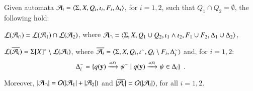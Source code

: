 \begin{theorem}\label{thm:closure}
  Given automata $\mathcal{A}_i = \langle \Sigma,X,Q_i,\iota_i,F_i,\Delta_i \rangle$,
  for $i=1,2$, such that $Q_1 \cap Q_2 = \emptyset$, the following hold: 
  \begin{compactenum}
    \item\label{it1:thm:closure} ${\mathcal L}({\mathcal{A}_\cap}) = {\mathcal L}({\mathcal{A}_1}) \cap {\mathcal L}({\mathcal{A}_2})$, where
      $\mathcal{A}_\cap = \langle \Sigma,X,Q_1 \cup Q_2, \iota_1 \wedge \iota_2,
      F_1 \cup F_2, \Delta_1 \cup \Delta_2 \rangle$, 
    \item\label{it2:thm:closure} ${\mathcal L}({\overline{\mathcal{A}_i}}) = \Sigma[X]^*
      \setminus {\mathcal L}({\mathcal{A}_i})$, where $\overline{\mathcal{A}_i} =
      \langle \Sigma,X,Q_i,{\iota}^{\sim},Q_i\setminus
        F_i,{\Delta}^{\sim}_i \rangle$ and, for $i=1,2$: \[{\Delta}^{\sim}_i =
      \{ q(\mathbf y) \xrightarrow{{\scriptscriptstyle a(X)}}_{{\scriptstyle }} {\psi}^{\sim} \mid
        q(\mathbf y) \xrightarrow{{\scriptscriptstyle a(X)}}_{{\scriptstyle }} \psi \in
        \Delta_i \}\enspace.\]
  \end{compactenum}
  Moreover, ${|{\mathcal{A}_\cap}|} = \mathcal{O}({{|{\mathcal{A}_1}|}+{|{\mathcal{A}_2}|}})$ and
  ${|{\overline{\mathcal{A}_i}}|} = \mathcal{O}({{|{\mathcal{A}_i}|}})$, for all $i=1,2$.
\end{theorem}
